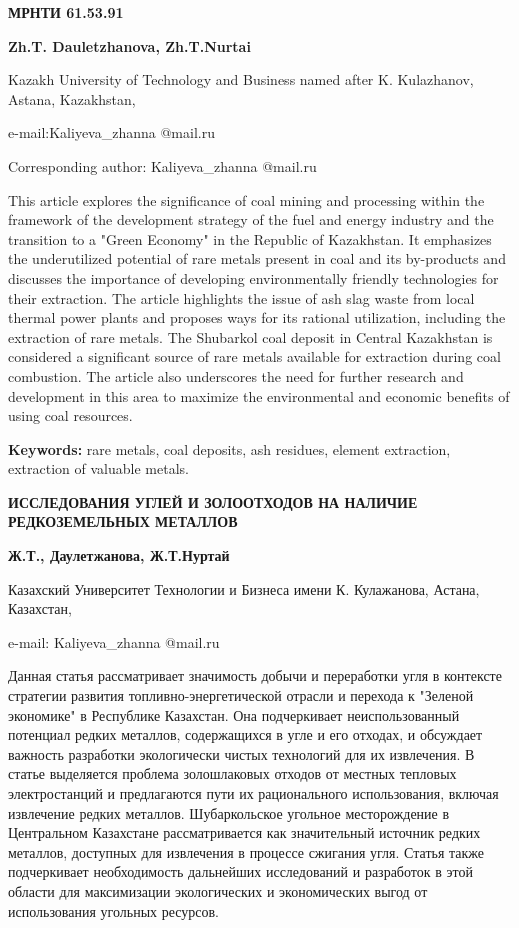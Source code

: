 \newpage
{\bfseries МРНТИ 61.53.91}


\begin{center}
{\bfseries Zh.T. Dauletzhanova, Zh.T.Nurtai}

Kazakh University of Technology and Business named after K. Kulazhanov,
Astana, Kazakhstan,

e-mail:Kaliyeva\_zhanna @mail.ru

Corresponding author: Kaliyeva\_zhanna @mail.ru
\end{center}

This article explores the significance of coal mining and processing
within the framework of the development strategy of the fuel and energy
industry and the transition to a "Green Economy" in the Republic of
Kazakhstan. It emphasizes the underutilized potential of rare metals
present in coal and its by-products and discusses the importance of
developing environmentally friendly technologies for their extraction.
The article highlights the issue of ash slag waste from local thermal
power plants and proposes ways for its rational utilization, including
the extraction of rare metals. The Shubarkol coal deposit in Central
Kazakhstan is considered a significant source of rare metals available
for extraction during coal combustion. The article also underscores the
need for further research and development in this area to maximize the
environmental and economic benefits of using coal resources.

{\bfseries Keywords:} rare metals, coal deposits, ash residues, element
extraction, extraction of valuable metals.

\begin{center}
{\large\bfseries ИССЛЕДОВАНИЯ УГЛЕЙ И ЗОЛООТХОДОВ НА НАЛИЧИЕ РЕДКОЗЕМЕЛЬНЫХ МЕТАЛЛОВ}

{\bfseries Ж.Т., Даулетжанова, Ж.Т.Нуртай}

Казахский Университет Технологии и Бизнеса имени К. Кулажанова, Астана,
Казахстан,

e-mail: Kaliyeva\_zhanna @mail.ru
\end{center}

Данная статья рассматривает значимость добычи и переработки угля в
контексте стратегии развития топливно-энергетической отрасли и перехода
к "Зеленой экономике" в Республике Казахстан. Она подчеркивает
неиспользованный потенциал редких металлов, содержащихся в угле и его
отходах, и обсуждает важность разработки экологически чистых технологий
для их извлечения. В статье выделяется проблема золошлаковых отходов от
местных тепловых электростанций и предлагаются пути их рационального
использования, включая извлечение редких металлов. Шубаркольское
угольное месторождение в Центральном Казахстане рассматривается как
значительный источник редких металлов, доступных для извлечения в
процессе сжигания угля. Статья также подчеркивает необходимость
дальнейших исследований и разработок в этой области для максимизации
экологических и экономических выгод от использования угольных ресурсов.

